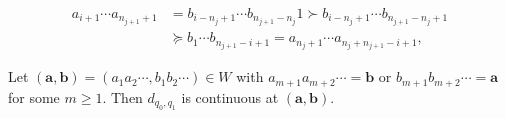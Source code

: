 \documentclass[10pt,a4paper]{amsart}
\newcommand{\ba}{\mathbf{a}}
\newcommand{\bb}{\mathbf{b}}
\begin{document}
\begin{equation} \label{e:anj}
\begin{aligned}
a_{i+1} \cdots a_{n_{j+1}+1} & = b_{i-n_j+1} \cdots b_{n_{j+1}-n_j} 1 \succ b_{i-n_j+1} \cdots b_{n_{j+1}-n_j+1} \\
& \succeq b_1 \cdots b_{n_{j+1}-i+1} = a_{n_j+1} \cdots a_{n_j+n_{j+1}-i+1},
\end{aligned}
\end{equation}

\begin{proposition} \label{p:together}
Let $(\ba,\bb) = (a_1a_2\cdots, b_1b_2\cdots) \in W$ with $a_{m+1} a_{m+2} \cdots = \bb$ or $b_{m+1} b_{m+2} \cdots = \ba$ for some $m \ge 1$.
Then $d_{q_0,q_1}$ is continuous at $(\ba,\bb)$. 
\end{proposition}
\end{document}
